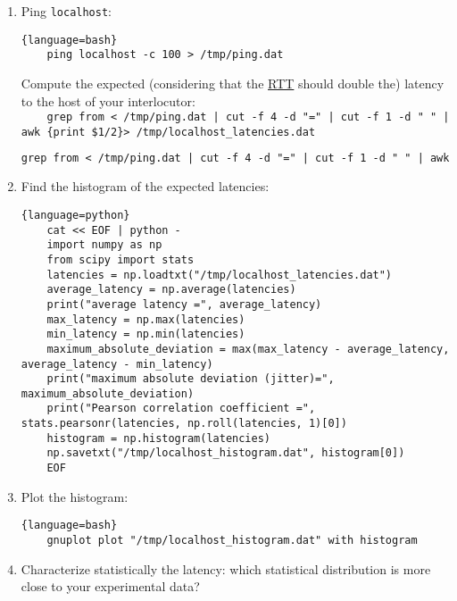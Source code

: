 \begin{enumerate}
\item Ping \texttt{localhost}:
   \begin{lstlisting}{language=bash}
    ping localhost -c 100 > /tmp/ping.dat
  \end{lstlisting}
Compute the expected (considering that the
  \href{https://en.wikipedia.org/wiki/Round-trip_delay}{RTT} should
  double the) latency to the host of your interlocutor:\\
\texttt{~~~~grep from < /tmp/ping.dat | cut -f 4 -d "=" | cut -f 1 -d " " | awk
  \textquotesingle\{print \$1/2\}\textquotesingle > /tmp/localhost\_latencies.dat}

\begin{lstlisting}[language=tex, mathescape]
  grep from < /tmp/ping.dat | cut -f 4 -d "=" | cut -f 1 -d " " | awk '{print $\mbox{\textdollar}$1/2}' > /tmp/localhost\_latencies.dat
\end{lstlisting}

\item Find the histogram of the expected latencies:
  \begin{lstlisting}{language=python}
    cat << EOF | python -
    import numpy as np
    from scipy import stats
    latencies = np.loadtxt("/tmp/localhost_latencies.dat")
    average_latency = np.average(latencies)
    print("average latency =", average_latency)
    max_latency = np.max(latencies)
    min_latency = np.min(latencies)
    maximum_absolute_deviation = max(max_latency - average_latency, average_latency - min_latency)
    print("maximum absolute deviation (jitter)=", maximum_absolute_deviation)
    print("Pearson correlation coefficient =", stats.pearsonr(latencies, np.roll(latencies, 1)[0])
    histogram = np.histogram(latencies)
    np.savetxt("/tmp/localhost_histogram.dat", histogram[0])
    EOF
  \end{lstlisting}

\item Plot the histogram:
  \begin{lstlisting}{language=bash}
    gnuplot plot "/tmp/localhost_histogram.dat" with histogram
  \end{lstlisting}
  
\item Characterize statistically the latency: which statistical
  distribution is more close to your experimental data?
\end{enumerate}

